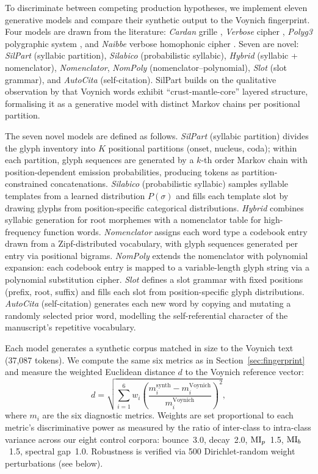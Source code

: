 To discriminate between competing production hypotheses, we implement eleven generative models and compare their synthetic output to the Voynich fingerprint.  Four models are drawn from the literature: \emph{Cardan} grille \citep{rugg2004}, \emph{Verbose} cipher \citep{timm2020}, \emph{Polyg3} polygraphic system \citep{hermes2022b}, and \emph{Naibbe} verbose homophonic cipher \citep{greshko2025}.  Seven are novel: \emph{SilPart} (syllabic partition), \emph{Silabico} (probabilistic syllabic), \emph{Hybrid} (syllabic + nomenclator), \emph{Nomenclator}, \emph{NomPoly} (nomenclator--polynomial), \emph{Slot} (slot grammar), and \emph{AutoCita} (self-citation).  SilPart builds on the qualitative observation by \citet{stolfi1997} that Voynich words exhibit ``crust-mantle-core'' layered structure, formalising it as a generative model with distinct Markov chains per positional partition.

The seven novel models are defined as follows.  \emph{SilPart} (syllabic partition) divides the glyph inventory into $K$ positional partitions (onset, nucleus, coda); within each partition, glyph sequences are generated by a $k$-th order Markov chain with position-dependent emission probabilities, producing tokens as partition-constrained concatenations.  \emph{Silabico} (probabilistic syllabic) samples syllable templates from a learned distribution $P(\sigma)$ and fills each template slot by drawing glyphs from position-specific categorical distributions.  \emph{Hybrid} combines syllabic generation for root morphemes with a nomenclator table for high-frequency function words.  \emph{Nomenclator} assigns each word type a codebook entry drawn from a Zipf-distributed vocabulary, with glyph sequences generated per entry via positional bigrams.  \emph{NomPoly} extends the nomenclator with polynomial expansion: each codebook entry is mapped to a variable-length glyph string via a polynomial substitution cipher.  \emph{Slot} defines a slot grammar with fixed positions (prefix, root, suffix) and fills each slot from position-specific glyph distributions.  \emph{AutoCita} (self-citation) generates each new word by copying and mutating a randomly selected prior word, modelling the self-referential character of the manuscript's repetitive vocabulary.

Each model generates a synthetic corpus matched in size to the Voynich text (37,087 tokens).  We compute the same six metrics as in Section~\ref{sec:fingerprint} and measure the weighted Euclidean distance $d$ to the Voynich reference vector:
\begin{equation}
  d = \sqrt{\sum_{i=1}^{6} w_i \left(\frac{m_i^{\text{synth}} - m_i^{\text{Voynich}}}{m_i^{\text{Voynich}}}\right)^2},
\end{equation}
where $m_i$ are the six diagnostic metrics.  Weights are set proportional to each metric's discriminative power as measured by the ratio of inter-class to intra-class variance across our eight control corpora: bounce~3.0, decay~2.0, $\mathrm{MI}_p$~1.5, $\mathrm{MI}_b$~1.5, spectral gap~1.0.  Robustness is verified via 500 Dirichlet-random weight perturbations (see below).

